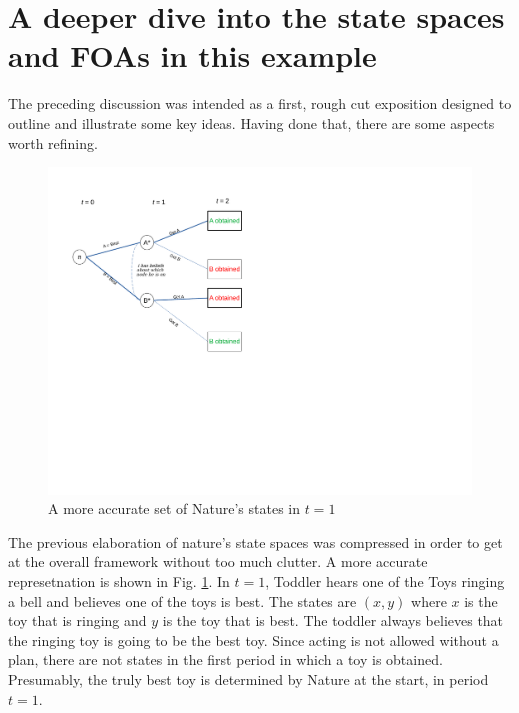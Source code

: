 \documentclass[
11pt,
titlepage,
reqno,
]{article}%
\theoremstyle{definition}
\begin{document}
\section*{A deeper dive into the state spaces and FOAs in this example}
The preceding discussion was intended as a first, rough cut exposition designed to outline and illustrate some key ideas. Having done that, there are some aspects worth refining.  

\begin{figure}[h!]
	\centering
	\includegraphics*[page=15,trim = 0in 7in 6in 0in,scale=1]{Awareness_Diagrams_All}
	\caption{A more accurate set of Nature's states in $t=1$\label{Diag: p-15}}%
\end{figure}

The previous elaboration of nature's state spaces was compressed in order to get at the overall framework without too much clutter. A more accurate represetnation is shown in Fig. \ref{Diag: p-15}. In $t=1$, Toddler hears one of the Toys ringing a bell and believes one of the toys is best. The states are $(x,y)$ where $x$ is the toy that is ringing and $y$ is the toy that is best. The toddler always believes that the ringing toy is going to be the best toy. Since acting is not allowed without a plan, there are not states in the first period in which a toy is obtained. Presumably, the truly best toy is determined by Nature at the start, in period $t=1$.
\end{document}
